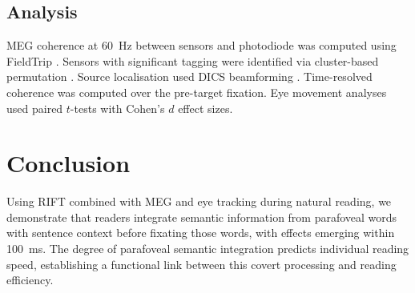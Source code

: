\documentclass[11pt]{article}
\begin{document}
\subsection{Analysis}
MEG coherence at 60~Hz between sensors and photodiode was computed using FieldTrip \citep{oostenveld2011fieldtrip}. Sensors with significant tagging were identified via cluster-based permutation \citep{maris2007nonparametric}. Source localisation used DICS beamforming \citep{gross2001dynamic}. Time-resolved coherence was computed over the pre-target fixation. Eye movement analyses used paired $t$-tests with Cohen's $d$ effect sizes.

\section{Conclusion}

Using RIFT combined with MEG and eye tracking during natural reading, we demonstrate that readers integrate semantic information from parafoveal words with sentence context before fixating those words, with effects emerging within 100~ms. The degree of parafoveal semantic integration predicts individual reading speed, establishing a functional link between this covert processing and reading efficiency.



\end{document}
